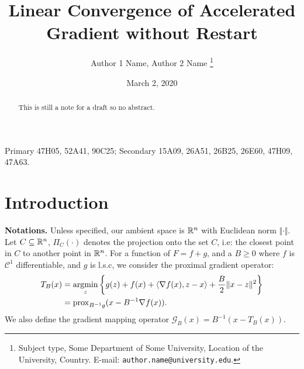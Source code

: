 \documentclass[12pt]{article}
\begin{document}
\newcommand{\dist}{\ensuremath{\operatorname{dist}}}

\title{{\selectfont Linear Convergence of Accelerated Gradient without Restart}}

\author{
    Author 1 Name, Author 2 Name
    \thanks{
        Subject type, Some Department of Some University, Location of the University,
        Country. E-mail: \texttt{author.name@university.edu}.
    }
}

\date{March 2, 2020}

\maketitle
{}

\begin{abstract} 
    \noindent
    This is still a note for a draft so no abstract. 
\end{abstract}

Primary 47H05, 52A41, 90C25; Secondary 15A09, 26A51, 26B25, 26E60, 47H09, 47A63.


\section{Introduction}
    \textbf{Notations.}
    Unless specified, our ambient space is $\mathbb R^n$ with Euclidean norm $\Vert \cdot\Vert$.
    Let $C\subseteq \mathbb R^n$, $\Pi_C(\cdot)$ denotes the projection onto the set $C$, i.e: the closest point in $C$ to another point in $\mathbb R^n$. 
    For a function of $F = f + g$, and a $B\ge 0$ where $f$ is $\mathcal C^1$ differentiable, and $g$ is l.s.c, we consider the proximal gradient operator: 
    \begin{align*}
        T_B(x) &= \mathop{\rm argmin}\limits_{z} \left\lbrace
            g(z) + f(x) + \langle \nabla f(x), z - x\rangle + \frac{B}{2}\Vert x - z\Vert^2
        \right\rbrace
        \\
        &= \operatorname{prox}_{B^{-1}g}(x - B^{-1}\nabla f(x)). 
    \end{align*}
    We also define the gradient mapping operator $\mathcal G_B(x) = B^{-1}(x - T_B(x))$. 
\end{document}
